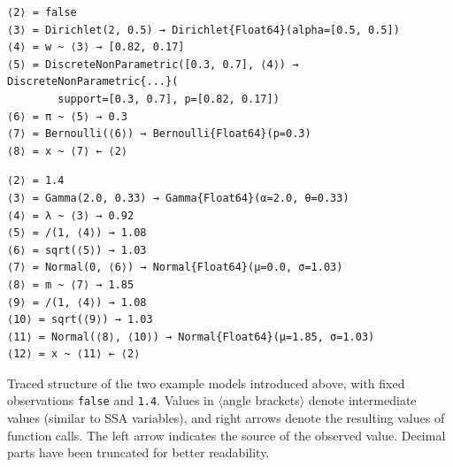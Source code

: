 \newsavebox{\bernoullitrace}
\begin{lrbox}{\bernoullitrace}
\begin{lstlisting}[style=lstfloat]
⟨2⟩ = false
⟨3⟩ = Dirichlet(2, 0.5) → Dirichlet{Float64}(alpha=[0.5, 0.5])
⟨4⟩ = w ~ ⟨3⟩ → [0.82, 0.17]
⟨5⟩ = DiscreteNonParametric([0.3, 0.7], ⟨4⟩) → DiscreteNonParametric{...}(
        support=[0.3, 0.7], p=[0.82, 0.17])
⟨6⟩ = π ~ ⟨5⟩ → 0.3
⟨7⟩ = Bernoulli(⟨6⟩) → Bernoulli{Float64}(p=0.3)
⟨8⟩ = x ~ ⟨7⟩ ← ⟨2⟩
\end{lstlisting}
\end{lrbox}
\newsavebox{\gaussiantrace}
\begin{lrbox}{\gaussiantrace}
\begin{lstlisting}[style=lstfloat]
⟨2⟩ = 1.4
⟨3⟩ = Gamma(2.0, 0.33) → Gamma{Float64}(α=2.0, θ=0.33)
⟨4⟩ = λ ~ ⟨3⟩ → 0.92
⟨5⟩ = /(1, ⟨4⟩) → 1.08
⟨6⟩ = sqrt(⟨5⟩) → 1.03
⟨7⟩ = Normal(0, ⟨6⟩) → Normal{Float64}(μ=0.0, σ=1.03)
⟨8⟩ = m ~ ⟨7⟩ → 1.85
⟨9⟩ = /(1, ⟨4⟩) → 1.08
⟨10⟩ = sqrt(⟨9⟩) → 1.03
⟨11⟩ = Normal(⟨8⟩, ⟨10⟩) → Normal{Float64}(μ=1.85, σ=1.03)
⟨12⟩ = x ~ ⟨11⟩ ← ⟨2⟩
\end{lstlisting}
\end{lrbox}
\begin{lstfloat}[p]
  \loosesubcaptions
  \begin{minipage}{\textwidth}
    \usebox{\bernoullitrace}
  \end{minipage}
  \par\vspace{\baselineskip}
  \begin{minipage}{\textwidth}
    \usebox{\gaussiantrace}
  \end{minipage}
    \par\vspace{\baselineskip}
  \caption{Traced structure of the two example models introduced above, with fixed observations
    \texttt{false} and \texttt{1.4}.  Values in \(\langle\)angle brackets\(\rangle\) denote
    intermediate values (similar to SSA variables), and right arrows denote the resulting values of
    function calls.  The left arrow indicates the source of the observed value.  Decimal parts have
    been truncated for better readability.}
  \label{lst:trace-examples}
\end{lstfloat}

\FloatBlock

